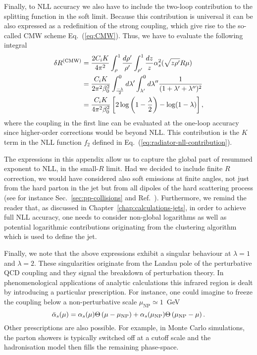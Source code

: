 Finally, to NLL accuracy we also have to include the two-loop contribution to the splitting function in the soft limit. Because this contribution is universal it can be also expressed as a redefinition of the strong coupling, which give rise to the so-called CMW scheme Eq.~(\ref{eq:CMW}).
%
Thus, we have to evaluate the following integral
\begin{align}\label{app:analytic-CMW}
  \delta R^{\text{(CMW)}}
  &=\frac{2 C_i K}{4 \pi^2} \int_\rho^1 \frac{d \rho'}{\rho'} \int_{\rho'}^1 \frac{d z}{z} \alpha_s^2( \sqrt{z \rho'} R\mu) \\
&=\frac{C_i K }{ 2\pi^2 \beta_0^2}  \int_\frac{-\lambda}{2}^0 d \lambda' \int_{\lambda'}^0 d \lambda'' \frac{1}{(1+\lambda'+\lambda'' )^2}\nonumber \\
&=\frac{C_i K }{ 4\pi^2 \beta_0^2} \left[2 \log\left(1-\frac{\lambda}{2} \right) -\log(1-\lambda)\right],\nonumber
\end{align}
where the coupling in the first line can be evaluated at the one-loop
accuracy since higher-order corrections would be beyond NLL.
%
This contribution is the $K$ term in the NLL function $f_2$ defined in
Eq.~(\ref{eq:radiator-nll-contribution}).


The expressions in this appendix allow us to capture the global part
of resummed exponent to NLL, in the small-$R$ limit. Had we decided to
include finite $R$ correction, we would have considered also soft
emissions at finite angles, not just from the hard parton in the jet
but from all dipoles of the hard scattering process (see for instance
Sec.~\ref{sec:pp-collisions} and
Ref.~\cite{Dasgupta:2012hg}). Furthermore, we remind the reader that,
as discussed in Chapter~\ref{chap:calculations-jets}, in order to
achieve full NLL accuracy, one needs to consider non-global logarithms
as well as potential logarithmic contributions originating from the
clustering algorithm which is used to define the jet.

Finally, we note that the above expressions exhibit a singular behaviour at $\lambda=1$ and $\lambda=2$.
These singularities originate from the Landau pole of the perturbative QCD coupling and they signal the breakdown of perturbation theory. In phenomenological applications of analytic calculations this infrared region is dealt by introducing a particular prescription. For instance, one could imagine to freeze the coupling below  a non-perturbative scale $\mu_\text{NP}\simeq 1$~GeV
\begin{equation}\label{eq:coupling-freezing}
\bar{\alpha}_s (\mu)= \alpha_s(\mu)\Theta\left (\mu-\mu_\text{NP}\right)+\alpha_s(\mu_\text{NP})\Theta\left (\mu_\text{NP}-\mu\right).
\end{equation}
Other prescriptions are also possible. For example, in Monte Carlo
simulations, the parton showers is typically switched off at a cutoff
scale and the hadronisation model then fills the remaining
phase-space.

